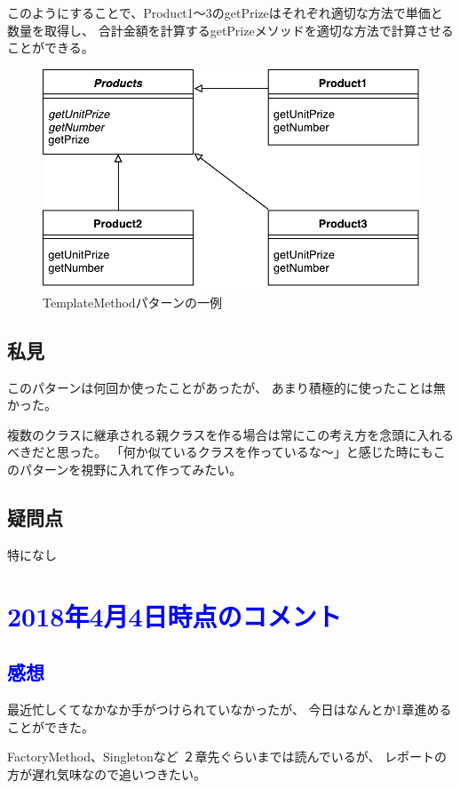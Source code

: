 \documentclass[11pt]{jsarticle}
\begin{document}
			このようにすることで、Product1〜3のgetPrizeはそれぞれ適切な方法で単価と数量を取得し、
			合計金額を計算するgetPrizeメソッドを適切な方法で計算させることができる。
			
			\begin{figure}[htbp]
				\centering
				\includegraphics[width = 0.5\hsize]{TemplateMethodPattern.pdf}
				\caption{TemplateMethodパターンの一例}
				\label{fig::TemplateMethod1}
			\end{figure}
			
		\subsection{私見}
			このパターンは何回か使ったことがあったが、
			あまり積極的に使ったことは無かった。
			
			複数のクラスに継承される親クラスを作る場合は常にこの考え方を念頭に入れるべきだと思った。
			「何か似ているクラスを作っているな〜」と感じた時にもこのパターンを視野に入れて作ってみたい。
		
		\color{red}
		\subsection{疑問点}
			特になし
		\color{black}
		
		\section*{\textcolor{blue}{2018年4月4日時点のコメント}}
		\subsection*{\textcolor{blue}{感想}}
			最近忙しくてなかなか手がつけられていなかったが、
			今日はなんとか1章進めることができた。
			
			FactoryMethod、Singletonなど
			２章先ぐらいまでは読んでいるが、
			レポートの方が遅れ気味なので追いつきたい。
			\clearpage
			
				
			
			
			
			
			
			
			
			
			
			
			
			
			
			
			
			
			
			
			
			
			
		
\end{document}
